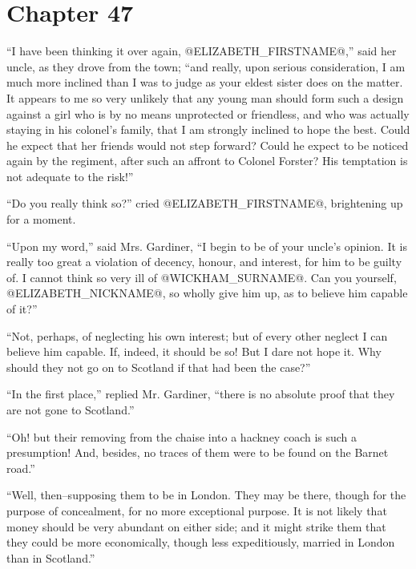 \chapter*{Chapter 47}


``I have been thinking it over again, @ELIZABETH_FIRSTNAME@,'' said her uncle, as they
drove from the town; ``and really, upon serious consideration, I am much
more inclined than I was to judge as your eldest sister does on the
matter. It appears to me so very unlikely that any young man should
form such a design against a girl who is by no means unprotected or
friendless, and who was actually staying in his colonel's family, that I
am strongly inclined to hope the best. Could he expect that her friends
would not step forward? Could he expect to be noticed again by the
regiment, after such an affront to Colonel Forster? His temptation is
not adequate to the risk!''

``Do you really think so?'' cried @ELIZABETH_FIRSTNAME@, brightening up for a moment.

``Upon my word,'' said Mrs. Gardiner, ``I begin to be of your uncle's
opinion. It is really too great a violation of decency, honour, and
interest, for him to be guilty of. I cannot think so very ill of
@WICKHAM_SURNAME@. Can you yourself, @ELIZABETH_NICKNAME@, so wholly give him up, as to believe
him capable of it?''

``Not, perhaps, of neglecting his own interest; but of every other
neglect I can believe him capable. If, indeed, it should be so! But I
dare not hope it. Why should they not go on to Scotland if that had been
the case?''

``In the first place,'' replied Mr. Gardiner, ``there is no absolute proof
that they are not gone to Scotland.''

``Oh! but their removing from the chaise into a hackney coach is such
a presumption! And, besides, no traces of them were to be found on the
Barnet road.''

``Well, then--supposing them to be in London. They may be there, though
for the purpose of concealment, for no more exceptional purpose. It is
not likely that money should be very abundant on either side; and it
might strike them that they could be more economically, though less
expeditiously, married in London than in Scotland.''

